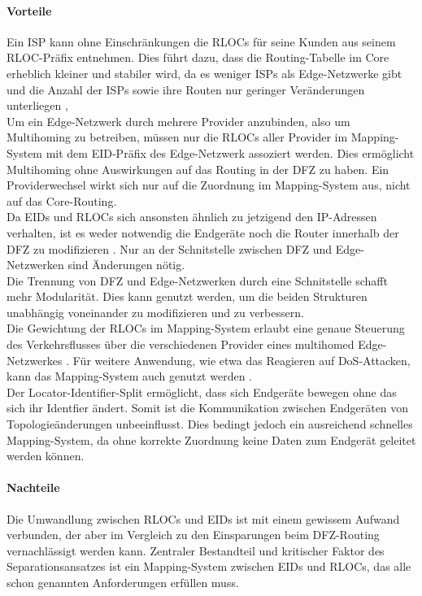 \paragraph{Vorteile}
Ein ISP kann ohne Einschränkungen die RLOCs für seine Kunden aus seinem RLOC-Präfix entnehmen. Dies führt dazu, dass die Routing-Tabelle im Core erheblich kleiner und stabiler wird, da es weniger ISPs als Edge-Netzwerke gibt und die Anzahl der ISPs sowie ihre Routen nur geringer Veränderungen unterliegen \cite{jen:2008:start},\cite{deering:1996:map} \\
Um ein Edge-Netzwerk durch mehrere Provider anzubinden, also um Multihoming zu betreiben, müssen nur die RLOCs aller Provider im Mapping-System mit dem EID-Präfix des Edge-Netzwerk assoziert werden\cite{farinacci:2009:LISP}. Dies ermöglicht Multihoming ohne Auswirkungen auf das Routing in der DFZ zu haben. Ein Providerwechsel wirkt sich nur auf die Zuordnung im  Mapping-System aus, nicht auf das Core-Routing. \\
Da EIDs und RLOCs sich ansonsten ähnlich zu jetzigend den IP-Adressen verhalten, ist es weder notwendig die Endgeräte noch die Router innerhalb der DFZ zu modifizieren \cite{jen:2008:start}. Nur an der Schnitstelle zwischen DFZ und Edge-Netzwerken sind Änderungen nötig. \\
Die Trennung von DFZ und Edge-Netzwerken durch eine Schnitstelle schafft mehr Modularität. Dies kann genutzt werden, um die beiden Strukturen unabhängig voneinander zu modifizieren und zu verbessern. \\ %
Die Gewichtung der RLOCs im Mapping-System erlaubt eine genaue Steuerung des Verkehrsflusses über die verschiedenen Provider eines multihomed Edge-Netzwerkes \cite{mathy:2008:dht}. Für weitere Anwendung, wie etwa das Reagieren auf DoS-Attacken, kann das Mapping-System auch genutzt werden \cite{jen:2008:start}. \\
Der Locator-Identifier-Split ermöglicht, dass sich Endgeräte bewegen ohne das sich ihr Identfier ändert. Somit ist die Kommunikation zwischen Endgeräten von Topologieänderungen unbeeinflusst. Dies bedingt jedoch ein ausreichend schnelles Mapping-System, da ohne korrekte Zuordnung keine Daten zum Endgerät geleitet werden können.

\paragraph{Nachteile}
Die Umwandlung zwischen RLOCs und EIDs ist mit einem gewissem Aufwand verbunden, der aber im Vergleich zu den Einsparungen beim DFZ-Routing vernachlässigt werden kann. Zentraler Bestandteil und kritischer Faktor des Separationsansatzes ist ein Mapping-System zwischen EIDs und RLOCs, das alle schon genannten Anforderungen erfüllen muss. 


